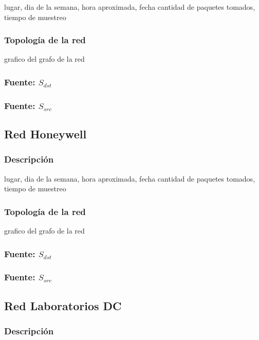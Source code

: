 \documentclass[10pt, a4paper]{article}
\begin{document}
lugar, dia de la semana, hora aproximada, fecha
cantidad de paquetes tomados, tiempo de muestreo

\subsubsection{Topología de la red}

grafico del grafo de la red

\subsubsection{Fuente: $S_{dst}$}

\subsubsection{Fuente: $S_{src}$}

\subsection{Red Honeywell}

\subsubsection{Descripción}

lugar, dia de la semana, hora aproximada, fecha
cantidad de paquetes tomados, tiempo de muestreo

\subsubsection{Topología de la red}

grafico del grafo de la red

\subsubsection{Fuente: $S_{dst}$}

\subsubsection{Fuente: $S_{src}$}

\subsection{Red Laboratorios DC}

\subsubsection{Descripción}
\end{document}
